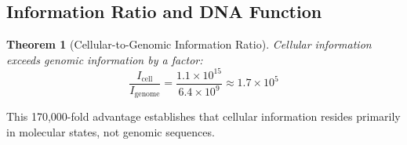 \documentclass[11pt,a4paper]{article}
\newtheorem{theorem}{Theorem}[section]
\theoremstyle{remark}
\begin{document}
\subsection{Information Ratio and DNA Function}

\begin{theorem}[Cellular-to-Genomic Information Ratio]
\label{thm:info_ratio}
Cellular information exceeds genomic information by a factor:
\begin{equation}
\frac{I_{\text{cell}}}{I_{\text{genome}}} = \frac{1.1 \times 10^{15}}{6.4 \times 10^9} \approx 1.7 \times 10^5
\end{equation}
\end{theorem}

This 170,000-fold advantage establishes that cellular information resides primarily in molecular states, not genomic sequences.
\end{document}
